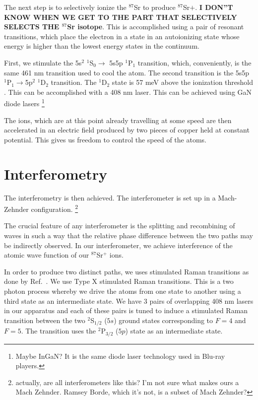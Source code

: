 The next step is to selectively ionize the $^{87}$Sr to produce $^{87}$Sr$+$. {\bf I DON''T KNOW WHEN WE GET TO THE PART THAT SELECTIVELY SELECTS THE $^{87}$Sr isotope}. This is accomplished using a pair of resonant transitions, which place the electron in a state in an autoionizing state whose energy is higher than the lowest energy states in the continuum. 

First, we stimulate the 5s$^2$ $^1$S$_0 \rightarrow$ 5s5p $^1$P$_1$ transition, which, conveniently, is the same 461 nm transition used to cool the atom. The second transition is the 5s5p $^1$P$_1\rightarrow$5p$^2$ $^1$D$_2$ transition. The $^1$D$_2$ state is 57 meV above the ionization threshold \cite{NSFprop}. This can be accomplished with a 408 nm laser. This can be achieved using GaN diode lasers \footnote{Maybe InGaN? It is the same diode laser technology used in Blu-ray players.}


The ions, which are at this point already travelling at some speed are then accelerated in an electric field produced by two pieces of copper held at constant potential. This gives us freedom to control the speed of the atoms. 


\section{Interferometry}

The interferometry is then achieved. The interferometer is set up in a Mach-Zehnder configuration. \footnote{actually, are all interferometers like this? I'm not sure what makes ours a Mach Zehnder. Ramsey Borde, which it's not, is a subset of Mach Zehnder? }

The crucial feature of any interferometer is the splitting and recombining of waves in such a way that the relative phase difference between the two paths may be indirectly observed. In our interferometer, we achieve interference of the atomic wave function of our $^{87}$Sr$^+$ ions. 

In order to produce two distinct paths, we uses stimulated Raman transitions as done by Ref.\ \cite{kasevichChu1991}. We use Type X stimulated Raman transitions. This is a two photon process whereby we drive the atoms from one state to another using a third state as an intermediate state. We have 3 pairs of overlapping 408 nm lasers in our apparatus and each of these pairs is tuned to induce a stimulated Raman transition between the two $^2$S$_{1/2}$ ($5s$) ground states corresponding to $F=4$ and $F=5$. The transition uses the $^2$P$_{3/2}$ ($5p$) state as an intermediate state. 

